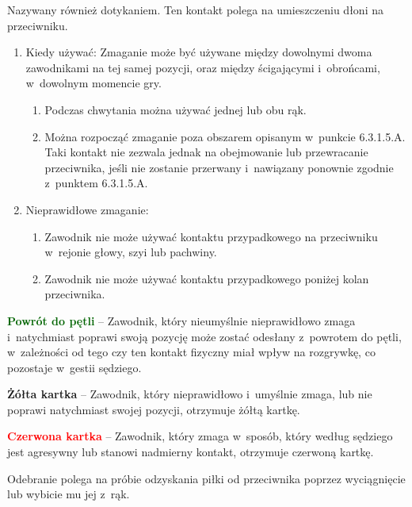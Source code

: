 \documentclass[12pt,a4paper]{article}
\renewcommand{\paragraph}[1]{
  \oldparagraph{#1}%
  \leftskip2.8cm
}
\newcommand\redcard[1]{\bgroup\textcolor{red}{\textbf{#1}}}
\newcommand\yellowcard[1]{\bgroup\textcolor{darkyellow}{\textbf{#1}}}
\newcommand\other[1]{\bgroup\textcolor{darkgreen}{\textbf{#1}}}
\begin{document}
\paragraph{Zmaganie}
Nazywany również dotykaniem. Ten kontakt
polega na umieszczeniu dłoni na przeciwniku.

\begin{enumerate}
	\item
	      Kiedy używać: Zmaganie może być używane między dowolnymi dwoma
	      zawodnikami na tej samej pozycji, oraz między ścigającymi i~obrońcami,
	      w~dowolnym momencie gry.

	      \begin{enumerate}
		      \item
		            Podczas chwytania można używać jednej lub obu rąk.
		      \item
		            Można rozpocząć zmaganie poza obszarem opisanym w~punkcie
		            6.3.1.5.A. Taki kontakt nie zezwala jednak na obejmowanie lub
		            przewracanie przeciwnika, jeśli nie zostanie przerwany i~nawiązany
		            ponownie zgodnie z~punktem 6.3.1.5.A.
	      \end{enumerate}
	\item
	      Nieprawidłowe zmaganie:

	      \begin{enumerate}
		      \item
		            Zawodnik nie może używać kontaktu przypadkowego na przeciwniku w~rejonie głowy, szyi lub pachwiny.
		      \item
		            Zawodnik nie może używać kontaktu przypadkowego poniżej kolan
		            przeciwnika.
	      \end{enumerate}
\end{enumerate}

\other{Powrót do pętli} -- Zawodnik, który nieumyślnie nieprawidłowo
zmaga i~natychmiast poprawi swoją pozycję może zostać odesłany z~powrotem do pętli, w~zależności od tego czy ten kontakt fizyczny miał
wpływ na rozgrywkę, co pozostaje w~gestii sędziego.

\yellowcard{Żółta kartka} -- Zawodnik, który nieprawidłowo i~umyślnie zmaga,
lub nie poprawi natychmiast swojej pozycji, otrzymuje żółtą kartkę.

\redcard{Czerwona kartka} -- Zawodnik, który zmaga w~sposób, który według
sędziego jest agresywny lub stanowi nadmierny kontakt, otrzymuje
czerwoną kartkę.

\paragraph{Odbieranie}
Odebranie polega na próbie odzyskania
piłki od przeciwnika poprzez wyciągnięcie lub wybicie mu jej z~rąk.
\end{document}
